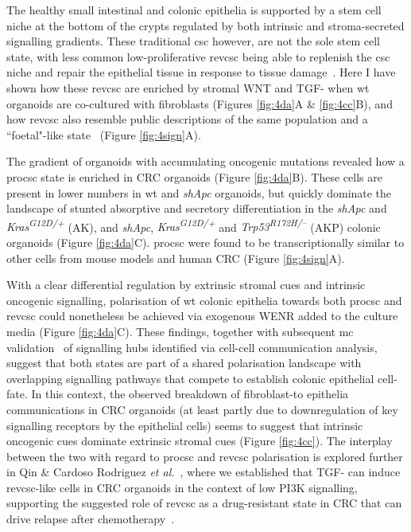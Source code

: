 The healthy small intestinal and colonic epithelia is supported by a stem cell niche at the bottom of the crypts regulated by both intrinsic and stroma-secreted signalling gradients. These traditional \acrfull{csc} however, are not the sole stem cell state, with less common low-proliferative \acrfull{revcsc} being able to replenish the \acrshort{csc} niche and repair the epithelial tissue in response to tissue damage~\cite{ayyaz_single-cell_2019}. Here I have shown how these \acrshort{revcsc} are enriched by stromal WNT and TGF-\textbeta\hspace{0.1cm} when \acrshort{wt} organoids are co-cultured with fibroblasts (Figures \ref{fig:4da}A \& \ref{fig:4cc}B), and how \acrshort{revcsc} also resemble public descriptions of the same population and a “foetal"-like state~\cite{mustata_identification_2013} (Figure \ref{fig:4sign}A).

The gradient of organoids with accumulating oncogenic mutations revealed how a \acrfull{procsc} state is enriched in CRC organoids (Figure \ref{fig:4da}B). These cells are present in lower numbers in \acrshort{wt} and \textit{shApc} organoids, but quickly dominate the landscape of stunted absorptive and secretory differentiation in the \textit{shApc} and \textit{Kras\textsuperscript{G12D/+}} (AK), and \textit{shApc}, \textit{Kras\textsuperscript{G12D/+}} and \textit{Trp53\textsuperscript{R172H/–}} (AKP) colonic organoids (Figure \ref{fig:4da}C). \acrshort{procsc} were found to be transcriptionally similar to other cells from mouse models and human CRC (Figure \ref{fig:4sign}A).

With a clear differential regulation by extrinsic stromal cues and intrinsic oncogenic signalling, polarisation of \acrshort{wt} colonic epithelia towards both \acrshort{procsc} and \acrshort{revcsc} could nonetheless be achieved via exogenous WENR added to the culture media (Figure \ref{fig:4da}C). These findings, together with subsequent \acrshort{mc} validation~\cite{cardoso_rodriguez_single-cell_2023} of signalling hubs identified via cell-cell communication analysis, suggest that both states are part of a shared polarisation landscape with overlapping signalling pathways that compete to establish colonic epithelial cell-fate.
In this context, the observed breakdown of fibroblast-to epithelia communications in CRC organoids (at least partly due to downregulation of key signalling receptors by the epithelial cells) seems to suggest that intrinsic oncogenic cues dominate extrinsic stromal cues (Figure \ref{fig:4cc}). The interplay between the two with regard to \acrshort{procsc} and \acrshort{revcsc} polarisation is explored further in Qin \& Cardoso Rodriguez \emph{et al.}~\cite{cardoso_rodriguez_single-cell_2023}, where we established that TGF-\textbeta\hspace{0.1cm} can induce \acrshort{revcsc}-like cells in CRC organoids in the context of low PI3K signalling, supporting the suggested role of \acrshort{revcsc} as a drug-resistant state in CRC that can drive relapse after chemotherapy~\cite{alvarez-varela_mex3a_2022, zapatero_trellis_2023}.

